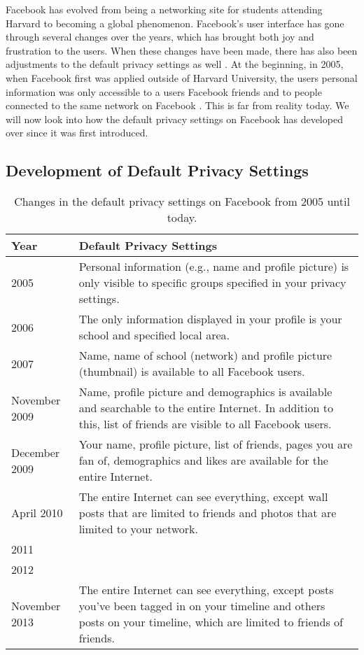 Facebook has evolved from being a networking site for students attending Harvard to becoming a global phenomenon. Facebook's user interface has gone through several changes over the years, which has brought both joy and frustration to the users. When these changes have been made, there has also been adjustments to the default privacy settings as well \cite{EvoPriv2}. At the beginning, in 2005, when Facebook first was applied outside of Harvard University, the users personal information was only accessible to a users Facebook friends and to people connected to the same network on Facebook \cite{EvoPriv}. This is far from reality today. We will now look into how the default privacy settings on Facebook has developed over since it was first introduced. 


\subsection{Development of Default Privacy Settings}

\begin{center}
\begin{table}
\caption{\label{tab:dps}Changes in the default privacy settings on Facebook from 2005 until today. \cite{EvoPriv,PrivTimeline}}
    \begin{tabular}{ | l | p{9cm} |}
    \hline
    \textbf{Year} & \textbf{Default Privacy Settings} \\ 
    \hline
    2005 & Personal information (e.g., name and profile picture) is 	only visible to specific groups specified in your privacy 			settings.\\ 
    \hline
    2006 & The only information displayed in your profile is your 		school and specified local area. \\ 
    \hline
    2007 & Name, name of school (network) and profile picture 			(thumbnail) is available to all Facebook users.\\
    \hline
    November 2009 & Name, profile picture and demographics is 			available and searchable to the entire Internet. In addition to 	this, list of friends are visible to all Facebook users.\\
	\hline
    December 2009 & Your name, profile picture, list of friends, 		pages you are fan of, demographics and likes are available for 		the entire Internet.\\
    \hline
    April 2010 & The entire Internet can see everything, except 		wall posts that are limited to friends and photos that are 			limited to your network. \\
    \hline
    2011 &  \\
    \hline
    2012 & \\
    \hline
    November 2013 & The entire Internet can see everything, except posts you've been tagged in on your timeline and others posts on your timeline, which are limited to friends of friends. \\ 
    \hline
    \end{tabular}
   \end{table}
\end{center}

